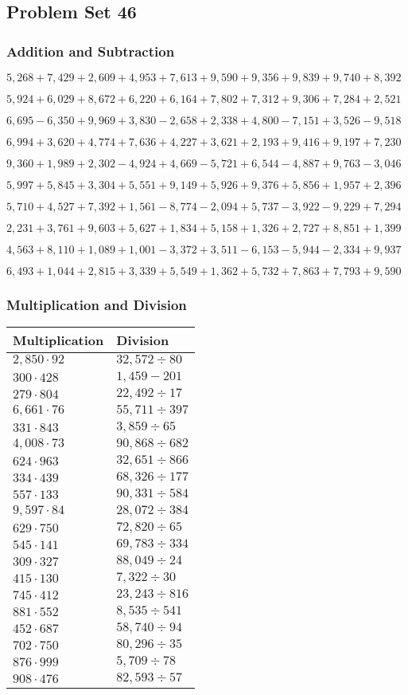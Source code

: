\hypertarget{problem-set-46-2}{%
\subsection{Problem Set 46}\label{problem-set-46-2}}

\hypertarget{addition-and-subtraction-208}{%
\subsubsection{Addition and
Subtraction}\label{addition-and-subtraction-208}}

\(5,268+7,429+2,609+4,953+7,613+9,590+9,356+9,839+9,740+ 8,392\)

\(5,924+6,029+8,672+6,220+6,164+7,802+7,312+9,306+7,284+2,521\)

\(6,695-6,350+9,969+3,830-2,658+2,338+4,800-7,151+3,526-9,518\)

\(6,994+3,620+4,774+7,636+4,227+3,621+2,193+9,416+9,197+7,230\)

\(9,360+1,989+2,302-4,924+4,669-5,721+6,544-4,887+9,763-3,046\)

\(5,997+5,845+3,304+5,551+9,149+5,926+9,376+5,856+1,957+2,396\)

\(5,710+4,527+7,392+1,561-8,774-2,094+5,737-3,922-9,229+7,294\)

\(2,231+3,761+9,603+5,627+1,834+5,158+1,326+2,727+8,851+1,399\)

\(4,563+8,110+1,089+1,001-3,372+3,511-6,153-5,944-2,334+9,937\)

\(6,493+1,044+2,815+3,339+5,549+1,362+5,732+7,863+7,793+9,590\)

\hypertarget{multiplication-and-division-207}{%
\subsubsection{Multiplication and
Division}\label{multiplication-and-division-207}}

\begin{longtable}[]{@{}ll@{}}
\toprule
Multiplication & Division\tabularnewline
\midrule
\endhead
\(2,850\cdot92\) & \(32,572÷80\)\tabularnewline
\(300\cdot428\) & \(1,459-201\)\tabularnewline
\(279\cdot804\) & \(22,492÷17\)\tabularnewline
\(6,661\cdot76\) & \(55,711÷397\)\tabularnewline
\(331\cdot843\) & \(3,859÷65\)\tabularnewline
\(4,008\cdot73\) & \(90,868÷682\)\tabularnewline
\(624\cdot963\) & \(32,651÷866\)\tabularnewline
\(334\cdot439\) & \(68,326÷177\)\tabularnewline
\(557\cdot133\) & \(90,331÷584\)\tabularnewline
\(9,597\cdot84\) & \(28,072÷384\)\tabularnewline
\(629\cdot750\) & \(72,820÷65\)\tabularnewline
\(545\cdot141\) & \(69,783÷334\)\tabularnewline
\(309\cdot327\) & \(88,049÷24\)\tabularnewline
\(415\cdot130\) & \(7,322÷30\)\tabularnewline
\(745\cdot412\) & \(23,243÷816\)\tabularnewline
\(881\cdot552\) & \(8,535÷541\)\tabularnewline
\(452\cdot687\) & \(58,740÷94\)\tabularnewline
\(702\cdot750\) & \(80,296÷35\)\tabularnewline
\(876\cdot999\) & \(5,709÷78\)\tabularnewline
\(908\cdot476\) & \(82,593÷57\)\tabularnewline
\bottomrule
\end{longtable}

